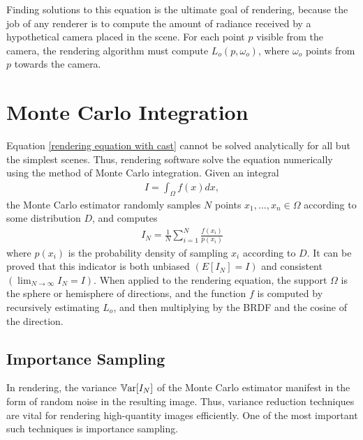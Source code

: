 Finding solutions to this equation is the ultimate goal of rendering, because the job of any renderer is to compute the amount of radiance received by a hypothetical camera placed in the scene. For each point $p$ visible from the camera, the rendering algorithm must compute $L_o(p,\omega_o)$, where $\omega_o$ points from $p$ towards the camera. 

\section{Monte Carlo Integration}

Equation \ref{rendering equation with cast} cannot be solved analytically for all but the simplest scenes. Thus, rendering software solve the equation numerically using the method of Monte Carlo integration. Given an integral
\begin{align*}
    I = \int_\Omega f(x) dx,
\end{align*}
the Monte Carlo estimator randomly samples $N$ points $x_1,...,x_n\in \Omega$ according to some distribution $D$, and computes
\begin{align}
    I_N = \frac{1}{N}\sum_{i=1}^{N} \frac{f(x_i)}{p(x_i)}
    \label{monte carlo estimator}
\end{align}
where $p(x_i)$ is the probability density of sampling $x_i$ according to $D$. It can be proved that this indicator is both unbiased $(E[I_N]=I)$ and consistent $(\lim_{N\to\infty}I_N = I)$. When applied to the rendering equation, the support $\Omega$ is the sphere or hemisphere of directions, and the function $f$ is computed by recursively estimating $L_o$, and then multiplying by the BRDF and the cosine of the direction.

\subsection{Importance Sampling}

In rendering, the variance $\mathbb{V}\text{ar}[I_N]$ of the Monte Carlo estimator manifest in the form of random noise in the resulting image. Thus, variance reduction techniques are vital for rendering high-quantity images efficiently. One of the most important such techniques is importance sampling.

